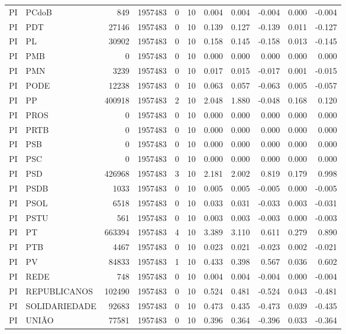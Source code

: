 \begin{landscape}
\begin{longtable}{llrrrrrrrrr}
PI & PCdoB & 849 & 1957483 & 0 & 10 & 0.004 & 0.004 & -0.004 & 0.000 & -0.004 \\
PI & PDT & 27146 & 1957483 & 0 & 10 & 0.139 & 0.127 & -0.139 & 0.011 & -0.127 \\
PI & PL & 30902 & 1957483 & 0 & 10 & 0.158 & 0.145 & -0.158 & 0.013 & -0.145 \\
PI & PMB & 0 & 1957483 & 0 & 10 & 0.000 & 0.000 & 0.000 & 0.000 & 0.000 \\
PI & PMN & 3239 & 1957483 & 0 & 10 & 0.017 & 0.015 & -0.017 & 0.001 & -0.015 \\
PI & PODE & 12238 & 1957483 & 0 & 10 & 0.063 & 0.057 & -0.063 & 0.005 & -0.057 \\
PI & PP & 400918 & 1957483 & 2 & 10 & 2.048 & 1.880 & -0.048 & 0.168 & 0.120 \\
PI & PROS & 0 & 1957483 & 0 & 10 & 0.000 & 0.000 & 0.000 & 0.000 & 0.000 \\
PI & PRTB & 0 & 1957483 & 0 & 10 & 0.000 & 0.000 & 0.000 & 0.000 & 0.000 \\
PI & PSB & 0 & 1957483 & 0 & 10 & 0.000 & 0.000 & 0.000 & 0.000 & 0.000 \\
PI & PSC & 0 & 1957483 & 0 & 10 & 0.000 & 0.000 & 0.000 & 0.000 & 0.000 \\
PI & PSD & 426968 & 1957483 & 3 & 10 & 2.181 & 2.002 & 0.819 & 0.179 & 0.998 \\
PI & PSDB & 1033 & 1957483 & 0 & 10 & 0.005 & 0.005 & -0.005 & 0.000 & -0.005 \\
PI & PSOL & 6518 & 1957483 & 0 & 10 & 0.033 & 0.031 & -0.033 & 0.003 & -0.031 \\
PI & PSTU & 561 & 1957483 & 0 & 10 & 0.003 & 0.003 & -0.003 & 0.000 & -0.003 \\
PI & PT & 663394 & 1957483 & 4 & 10 & 3.389 & 3.110 & 0.611 & 0.279 & 0.890 \\
PI & PTB & 4467 & 1957483 & 0 & 10 & 0.023 & 0.021 & -0.023 & 0.002 & -0.021 \\
PI & PV & 84833 & 1957483 & 1 & 10 & 0.433 & 0.398 & 0.567 & 0.036 & 0.602 \\
PI & REDE & 748 & 1957483 & 0 & 10 & 0.004 & 0.004 & -0.004 & 0.000 & -0.004 \\
PI & REPUBLICANOS & 102490 & 1957483 & 0 & 10 & 0.524 & 0.481 & -0.524 & 0.043 & -0.481 \\
PI & SOLIDARIEDADE & 92683 & 1957483 & 0 & 10 & 0.473 & 0.435 & -0.473 & 0.039 & -0.435 \\
PI & UNIÃO & 77581 & 1957483 & 0 & 10 & 0.396 & 0.364 & -0.396 & 0.033 & -0.364 \\

\end{longtable}
\end{landscape}
